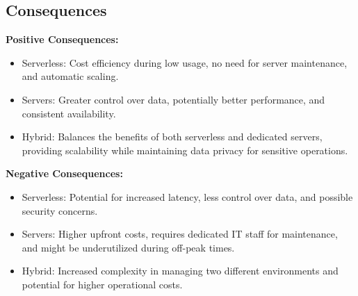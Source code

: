 \subsection*{Consequences}
\textbf{Positive Consequences:}
\begin{itemize}
    \item Serverless: Cost efficiency during low usage, no need for server maintenance, and automatic scaling.
    \item Servers: Greater control over data, potentially better performance, and consistent availability.
    \item Hybrid: Balances the benefits of both serverless and dedicated servers, providing scalability while maintaining data privacy for sensitive operations.
\end{itemize}
\textbf{Negative Consequences:}
\begin{itemize}
    \item Serverless: Potential for increased latency, less control over data, and possible security concerns.
    \item Servers: Higher upfront costs, requires dedicated IT staff for maintenance, and might be underutilized during off-peak times.
    \item Hybrid: Increased complexity in managing two different environments and potential for higher operational costs.
\end{itemize}
